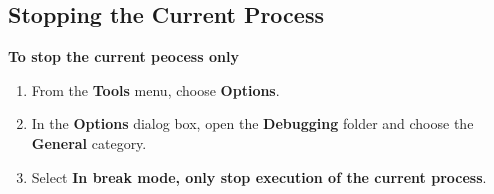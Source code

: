 	\subsection{Stopping the Current Process}
	\textbf{To stop the current peocess only}\\
	
	\begin{enumerate}
		\item From the \textbf{Tools} menu, choose \textbf{Options}.
		\item In the \textbf{Options} dialog box, open the \textbf{Debugging} folder and choose the \textbf{General} category.
		\item Select \textbf{In break mode, only stop execution of the current process}.
	\end{enumerate}
	
	

	